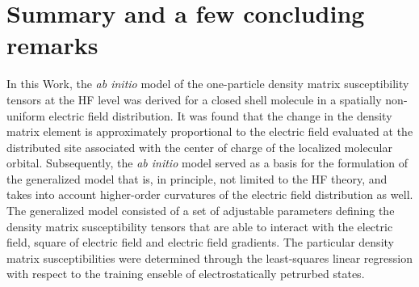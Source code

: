 \documentclass[aip,amsmath,amssymb,reprint]{revtex4-1}
\begin{document}








\section{\label{s:5}Summary and a few concluding remarks}

In this Work, the \emph{ab initio} model of the one\hyp{}particle density matrix susceptibility tensors
at the HF level was derived for a closed shell molecule in a spatially non\hyp{}uniform
electric field distribution. It was found that the change in the density matrix element
is approximately proportional to the electric field evaluated at the distributed site associated with the 
center of charge of the 
localized molecular orbital. Subsequently, the \emph{ab initio} model served as a basis
for the formulation of the generalized model that is, in principle, not limited to the HF theory,
and takes into account higher\hyp{}order curvatures of the electric field distribution as well.
The generalized model consisted of a set of adjustable parameters defining the density matrix susceptibility tensors
that are able to interact with the electric field, square of electric field and electric field gradients.
The particular density matrix susceptibilities were determined through the least\hyp{}squares 
linear regression with respect to the training enseble of electrostatically petrurbed states.
\end{document}
